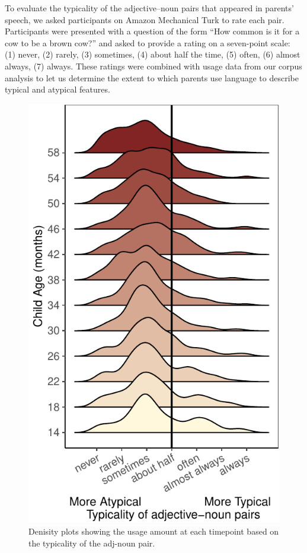 \documentclass[10pt, letterpaper]{article}
\newenvironment{CodeChunk}{}{}
\begin{document}
To evaluate the typicality of the adjective--noun pairs that appeared in
parents' speech, we asked participants on Amazon Mechanical Turk to rate
each pair. Participants were presented with a question of the form ``How
common is it for a cow to be a brown cow?'' and asked to provide a
rating on a seven-point scale: (1) never, (2) rarely, (3) sometimes, (4)
about half the time, (5) often, (6) almost always, (7) always. These
ratings were combined with usage data from our corpus analysis to let us
determine the extent to which parents use language to describe typical
and atypical features.

\begin{CodeChunk}
\begin{figure}[tb]

{\centering \includegraphics{figs/distribution_plot-1} 

}

\caption[Denisity plots showing the usage amount at each timepoint based on the typicality of the adj-noun pair]{Denisity plots showing the usage amount at each timepoint based on the typicality of the adj-noun pair.}\label{fig:distribution_plot}
\end{figure}
\end{CodeChunk}
\end{document}
